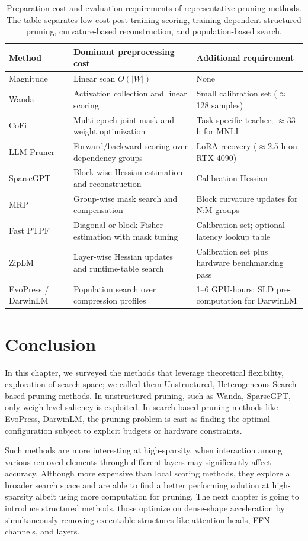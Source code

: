 \begin{table}[H]
	\centering
	\caption[Preparation cost and evaluation requirements of representative pruning methods.]{Preparation cost and evaluation requirements of representative pruning methods. The table separates low-cost post-training scoring, training-dependent structured pruning, curvature-based reconstruction, and population-based search.}
	\label{tab:preparation_cost_profile}
	\begin{tabularx}{\textwidth}{@{}>{\raggedright\arraybackslash}p{2.6cm}LL@{}}
		\toprule
		\textbf{Method} & \textbf{Dominant preprocessing cost} & \textbf{Additional requirement} \\ \midrule
		Magnitude & Linear scan $O(|W|)$ & None \\
		Wanda & Activation collection and linear scoring & Small calibration set ($\approx$128 samples) \\
		CoFi & Multi-epoch joint mask and weight optimization & Task-specific teacher; $\approx$33 h for MNLI \\
		LLM-Pruner & Forward/backward scoring over dependency groups & LoRA recovery ($\approx$2.5 h on RTX 4090) \\
		SparseGPT & Block-wise Hessian estimation and reconstruction & Calibration Hessian \\
		MRP & Group-wise mask search and compensation & Block curvature updates for N:M groups \\
		Fast PTPF & Diagonal or block Fisher estimation with mask tuning & Calibration set; optional latency lookup table \\
		ZipLM & Layer-wise Hessian updates and runtime-table search & Calibration set plus hardware benchmarking pass \\
		EvoPress / DarwinLM & Population search over compression profiles & 1--6 GPU-hours; SLD pre-computation for DarwinLM \\ \bottomrule
	\end{tabularx}
\end{table}



\section{Conclusion}
In this chapter, we surveyed the methods that leverage theoretical flexibility, exploration of search space; we called them Unstructured, Heterogeneous Search-based pruning methods. In unstructured pruning, such as Wanda, SparseGPT, only weigh-level saliency is exploited. In search-based pruning methods like EvoPress, DarwinLM, the pruning problem is cast as finding the optimal configuration subject to explicit budgets or hardware constraints. 

Such methods are more interesting at high-sparsity, when interaction among various removed elements through different layers may significantly affect accuracy. Although more expensive than local scoring methods, they explore a broader search space and are able to find a better performing solution at high-sparsity albeit using more computation for pruning. The next chapter is going to introduce structured methods, those optimize on dense-shape acceleration by simultaneously removing executable structures like attention heads, FFN channels, and layers.